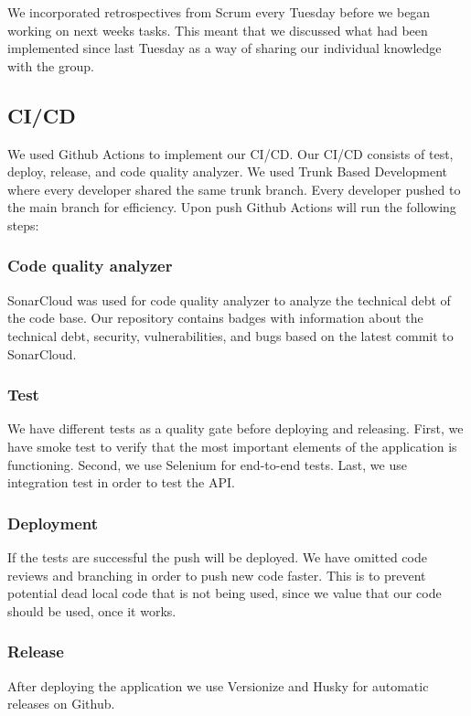 We incorporated retrospectives from Scrum every Tuesday before we began working on next weeks tasks. This meant that we discussed what had been implemented since last Tuesday as a way of sharing our individual knowledge with the group.

\subsection{CI/CD}
We used Github Actions to implement our CI/CD. Our CI/CD consists of test, deploy, release, and code quality analyzer. We used Trunk Based Development where every developer shared the same trunk branch. Every developer pushed to the main branch for efficiency. Upon push Github Actions will run the following steps:

\subsubsection{Code quality analyzer}
SonarCloud was used for code quality analyzer to analyze the technical debt of the code base. Our repository contains badges with information about the technical debt, security, vulnerabilities, and bugs based on the latest commit to SonarCloud.

\subsubsection{Test}
We have different tests as a quality gate before deploying and releasing. First, we have smoke test to verify that the most important elements of the application is functioning. Second, we use Selenium for end-to-end tests. Last, we use integration test in order to test the API.

\subsubsection{Deployment}
If the tests are successful the push will be deployed. We have omitted code reviews and branching in order to push new code faster. This is to prevent potential dead local code that is not being used, since we value that our code should be used, once it works.

\subsubsection{Release}
After deploying the application we use Versionize and Husky for automatic releases on Github.

